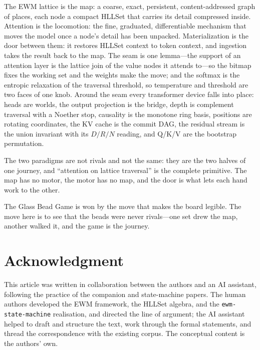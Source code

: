 \documentclass[11pt,a4paper]{article}
\theoremstyle{remark}
\begin{document}
The EWM lattice is the map: a coarse, exact, persistent, content-addressed graph
of places, each node a compact HLLSet that carries its detail compressed inside.
Attention is the locomotion: the fine, graduated, differentiable mechanism that
moves the model once a node's detail has been unpacked. Materialization is the
door between them: it restores HLLSet context to token context, and ingestion
takes the result back to the map. The seam is one lemma---the support of an
attention layer is the lattice join of the value nodes it attends to---so the
bitmap fixes the working set and the weights make the move; and the softmax is
the entropic relaxation of the traversal threshold, so temperature and threshold
are two faces of one knob. Around the seam every transformer device falls into
place: heads are worlds, the output projection is the bridge, depth is
complement traversal with a Noether stop, causality is the monotone ring basis,
positions are rotating coordinates, the KV cache is the commit DAG, the residual
stream is the union invariant with its $D/R/N$ reading, and Q/K/V are the
bootstrap permutation.

The two paradigms are not rivals and not the same: they are the two halves of
one journey, and ``attention on lattice traversal'' is the complete primitive.
The map has no motor, the motor has no map, and the door is what lets each hand
work to the other.

The Glass Bead Game is won by the move that makes the board legible. The move
here is to see that the beads were never rivals---one set drew the map, another
walked it, and the game is the journey.

\section*{Acknowledgment}
This article was written in collaboration between the authors and an AI
assistant, following the practice of the companion and state-machine papers.
The human authors developed the EWM framework, the HLLSet algebra, and the
\texttt{ewm-state-machine} realisation, and directed the line of argument; the
AI assistant helped to draft and structure the text, work through the formal
statements, and thread the correspondence with the existing corpus. The
conceptual content is the authors' own.

\appendix
\end{document}
